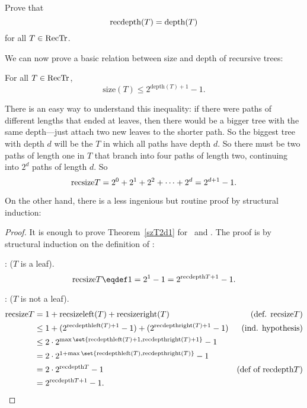 \begin{problem}
Prove that
\[
\text{recdepth}(T) = \text{depth}(T)
\]
for all $T \in \text{RecTr}$.
\begin{solution}
\end{solution}
\end{problem}

We can now prove a basic relation between size and depth of recursive
trees:
\begin{theorem}\label{szT2d1}
For all $T \in \text{RecTr}$,
\[
\text{size}(T) \leq 2^{\text{depth}(T)+1} - 1.
\]
\end{theorem}

There is an easy way to understand this inequality: if there were
paths of different lengths that ended at leaves, then there would be a
bigger tree with the same depth---just attach two new leaves to the
shorter path.  So the biggest tree with depth $d$ will be the
 $T$ in which all paths have depth $d$.  So there
must be two paths of length one in $T$ that branch into four paths of
length two, continuing into $2^d$ paths of length $d$.  So
\[
\text{recsize}T = 2^0 + 2^1 + 2^2 + \cdots + 2^d = 2^{d+1}-1.
\]

On the other hand, there is a less ingenious but routine proof by
structural induction:
\begin{proof} 
It is enough to prove Theorem~\ref{szT2d1} for \trsize\ and \trpdth.
The proof is by structural induction on the definition of \rectr:

: ($T$ is a leaf).
\[
\trsize{T} \eqdef 1 = 2^1 - 1 = 2^{\trdpth{T}+1} - 1.
\]

: ($T$ is not a leaf).
\begin{align*}
\trsize{T}
& = 1 + \trsize{\leftsub{(T)}} + \trsize{\rightsub{(T)}}
              & \text{(def. $\trsize{T}$)}\\
& \leq 1 + (2^{\trdpth{\leftsub{(T)}}+1} -1)  + (2^{\trdpth{\rightsub{(T)}}+1} -1)
              & \text{(ind. hypothesis)}\\
& \leq  2\cdot 2^{\max\set{\trdpth{\leftsub{(T)}}+1,\trdpth{\rightsub{(T)}}+1}} - 1\\
& = 2\cdot 2^{1+\max\set{\trdpth{\leftsub{(T)}},\trdpth{\rightsub{(T)}}}} - 1\\
& = 2\cdot 2^{\trdpth{T}} - 1
              & \text{(def of $\trdpth{T}$)}\\
& =  2^{\trdpth{T}+1} - 1.
\end{align*}
\end{proof}

